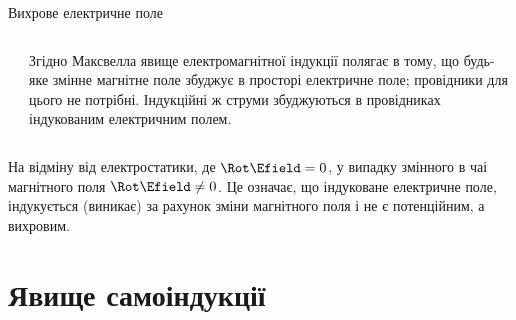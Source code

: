 \documentclass[onlytextwidth]{beamer}
\begin{document}
\begin{frame}{Вихрове електричне поле}{}
\begin{onlyenv}
\begin{columns}
\begin{column}{0.4\linewidth}
\begin{pict}
				\end{pict}
			\end{column}
			\begin{column}{0.6\linewidth}
				\begin{block}{}\justifying\small
					Згідно  Максвелла \alert{явище електромагнітної індукції} полягає в тому, що будь-яке змінне магнітне поле збуджує в просторі
					електричне поле; провідники для цього не потрібні. Індукційні ж струми збуджуються в провідниках індукованим електричним полем.
				\end{block}
			\end{column}
		\end{columns}
		\begin{block}{}\justifying\small
			На відміну від електростатики, де $\Rot\Efield = 0$, у випадку змінного в чаі магнітного поля $ \Rot\Efield \neq 0$. Це означає, що
			індуковане
			електричне поле, індукується (виникає) за рахунок зміни магнітного поля і не є потенційним, а вихровим.
		\end{block}
	\end{onlyenv}
\end{frame}



\section{Явище самоіндукції}
\end{document}
